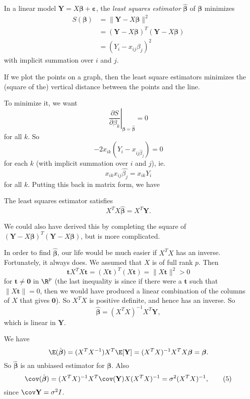 \documentclass[a4paper]{article}
\begin{document}
\begin{defi}
  In a linear model $\mathbf{Y} = X\boldsymbol\beta + \boldsymbol\varepsilon$, the \emph{least squares estimator} $\hat{\boldsymbol\beta}$ of $\boldsymbol\beta$ minimizes
  \begin{align*}
    S(\boldsymbol\beta) &= \|\mathbf{Y} - X\boldsymbol\beta\|^2\\
    &= (\mathbf{Y} - X\boldsymbol\beta)^T(\mathbf{Y} - X\boldsymbol\beta)\\
    &= (Y_i - x_{ij}\beta_j)^2
  \end{align*}
  with implicit summation over $i$ and $j$.

  If we plot the points on a graph, then the least square estimators minimizes the (square of the) vertical distance between the points and the line.
\end{defi}

To minimize it, we want
\[
  \left.\frac{\partial S}{\partial \beta_k}\right|_{\boldsymbol\beta = \hat{\boldsymbol\beta}} = 0
\]
for all $k$. So
\[
  -2 x_{ik}(Y_i - x_{ij\hat{\beta}_j}) = 0
\]
for each $k$ (with implicit summation over $i$ and $j$), ie.
\[
  x_{ik}x_{ij}\hat{\beta_j} = x_{ik}Y_i
\]
for all $k$. Putting this back in matrix form, we have
\begin{prop}
  The least squares estimator satisfies
  \[
    X^TX\hat{\boldsymbol\beta} = X^T\mathbf{Y}.\tag{3}
  \]
\end{prop}
We could also have derived this by completing the square of $(\mathbf{Y} - X\boldsymbol\beta)^T(\mathbf{Y} - X\boldsymbol\beta)$, but is more complicated.

In order to find $\hat{\boldsymbol\beta}$, our life would be much easier if $X^TX$ has an inverse. Fortunately, it always does. We assumed that $X$ is of full rank $p$. Then
\[
  \mathbf{t}X^TX\mathbf{t} = (X\mathbf{t})^T(X\mathbf{t}) = \|X\mathbf{t}\|^2 > 0
\]
for $\mathbf{t}\not= \mathbf{0}$ in $\R^p$ (the last inequality is since if there were a $\mathbf{t}$ such that $\|X\mathbf{t}\| = 0$, then we would have produced a linear combination of the columns of $X$ that gives $\mathbf{0}$). So $X^TX$ is positive definite, and hence has an inverse. So
\[
  \hat{\boldsymbol\beta} = (X^TX)^{-1} X^T\mathbf{Y},\tag{4}
\]
which is linear in $\mathbf{Y}$.

We have
\[
  \E(\hat{\boldsymbol\beta}) = (X^TX^{-1})X^T\E[\mathbf{Y}] = (X^TX)^{-1}X^TX\boldsymbol\beta = \boldsymbol\beta.
\]
So $\hat{\boldsymbol\beta}$ is an unbiased estimator for $\boldsymbol\beta$. Also
\[
  \cov(\hat{\boldsymbol\beta}) = (X^TX)^{-1}X^T \cov(\mathbf{Y})X(X^TX)^{-1} = \sigma^2(X^TX)^{-1} ,\tag{5}
\]
since $\cov \mathbf{Y} = \sigma^2 I$.
\end{document}

